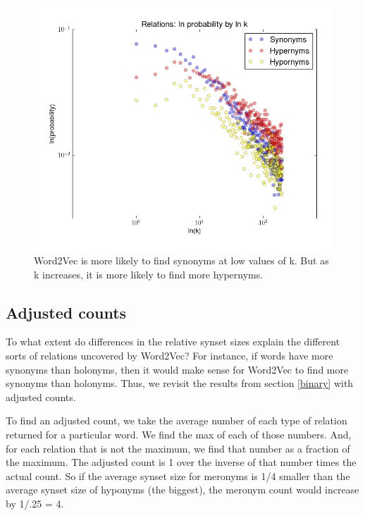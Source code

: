 \documentclass{article}
\begin{document}
\begin{figure}[!hb]
  \includegraphics[scale=.7]{loglog_prob.png}
  \caption{Word2Vec is more likely to find synonyms at low values of k. But as k increases, it is more likely to find more hypernyms.}
  \label{fig:loglog_prob}
\end{figure}

\subsection{Adjusted counts}
To what extent do differences in the relative synset sizes explain the different sorts of relations uncovered by Word2Vec? For instance, if words have more synonyms than holonyms, then it would make sense for Word2Vec to find more synonyms than holonyms. Thus, we revisit the results from section \ref{binary} with adjusted counts.

To find an adjusted count, we take the average number of each type of relation returned for a particular word. We find the max of each of those numbers. And, for each relation that is not the maximum, we find that number as a fraction of the maximum. The adjusted count is 1 over the inverse of that number times the actual count. So if the average synset size for meronyms is 1/4 smaller than the average synset size of hyponyms (the biggest), the meronym count would increase by 1/.25 = 4.
\end{document}
